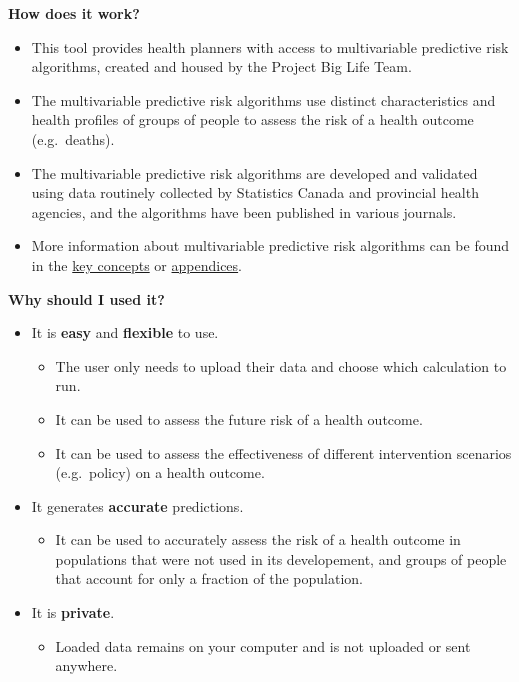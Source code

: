 \documentclass[]{book}
\providecommand{\tightlist}{%
  \setlength{\itemsep}{0pt}\setlength{\parskip}{0pt}}
\begin{document}
\textbf{How does it work?}

\begin{itemize}
\item
  This tool provides health planners with access to multivariable predictive risk algorithms, created and housed by the Project Big Life Team.
\item
  The multivariable predictive risk algorithms use distinct characteristics and health profiles of groups of people to assess the risk of a health outcome (e.g.~deaths).
\item
  The multivariable predictive risk algorithms are developed and validated using data routinely collected by Statistics Canada and provincial health agencies, and the algorithms have been published in various journals.
\item
  More information about multivariable predictive risk algorithms can be found in the \protect\hyperlink{keyconcepts}{key concepts} or \protect\hyperlink{mport}{appendices}.
\end{itemize}

\textbf{Why should I used it?}

\begin{itemize}
\item
  It is \textbf{easy} and \textbf{flexible} to use.

  \begin{itemize}
  \tightlist
  \item
    The user only needs to upload their data and choose which calculation to run.
  \item
    It can be used to assess the future risk of a health outcome.
  \item
    It can be used to assess the effectiveness of different intervention scenarios (e.g.~policy) on a health outcome.
  \end{itemize}
\item
  It generates \textbf{accurate} predictions.

  \begin{itemize}
  \tightlist
  \item
    It can be used to accurately assess the risk of a health outcome in populations that were not used in its developement, and groups of people that account for only a fraction of the population.
  \end{itemize}
\item
  It is \textbf{private}.

  \begin{itemize}
  \tightlist
  \item
    Loaded data remains on your computer and is not uploaded or sent anywhere.
  \end{itemize}
\end{itemize}
\end{document}
